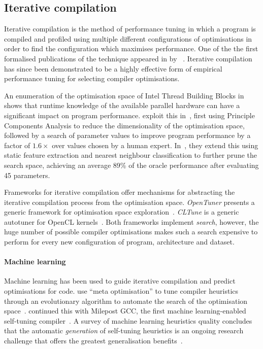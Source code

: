 \subsection{Iterative compilation}

Iterative compilation is the method of performance tuning in which a program is compiled and profiled using multiple different configurations of optimisations in order to find the configuration which maximises performance. One of the the first formalised publications of the technique appeared in \citeyear{Bodin1998} by \citeauthor{Bodin1998}~\cite{Bodin1998}.  Iterative compilation has since been demonstrated to be a highly effective form of empirical performance tuning for selecting compiler optimisations.

An enumeration of the optimisation space of Intel Thread Building Blocks in~\cite{Contreras2008} shows that runtime knowledge of the available parallel hardware can have a significant impact on program performance. \citeauthor{Collins2012} exploit this in~\cite{Collins2012}, first using Principle Components Analysis to reduce the dimensionality of the optimisation space, followed by a search of parameter values to improve program performance by a factor of $1.6\times$ over values chosen by a human expert. In~\cite{Collins2013}, they extend this using static feature extraction and nearest neighbour classification to further prune the search space, achieving an average 89\% of the oracle performance after evaluating 45 parameters.

Frameworks for iterative compilation offer mechanisms for abstracting the iterative compilation process from the optimisation space. \emph{OpenTuner} presents a generic framework for optimisation space exploration~\cite{Ansel2013}. \emph{CLTune} is a generic autotuner for OpenCL kernels~\cite{Nugteren2015}. Both frameworks implement \emph{search}, however, the huge number of possible compiler optimisations makes such a search expensive to perform for every new configuration of program, architecture and dataset.

\paragraph{Machine learning} Machine learning has been used to guide iterative compilation and predict optimisations for code. \citeauthor{Stephenson2003} use ``meta optimisation'' to tune compiler heuristics through an evolutionary algorithm to automate the search of the optimisation space~\cite{Stephenson2003}. \citeauthor{Fursin2011} continued this with Milepost GCC, the first machine learning-enabled self-tuning compiler~\cite{Fursin2011}. A survey of machine learning heuristics quality concludes that the automatic \emph{generation} of self-tuning heuristics is an ongoing research challenge that offers the greatest generalisation benefits~\cite{Burke2013}.

